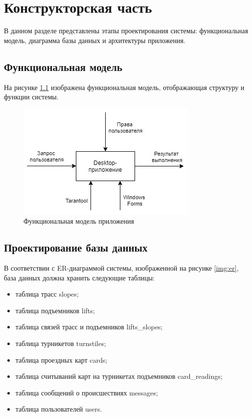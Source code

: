 \chapter{Конструкторская часть}

В данном разделе представлены этапы проектирования системы: функциональная модель, диаграмма базы данных и архитектуры приложения.

\section{Функциональная модель}

На рисунке \ref{img:func_model} изображена функциональная модель, отображающая структуру и функции системы.

\begin{figure}[h!]
	\begin{center}
		\includegraphics[scale=0.6]{../imgs/func_model.jpg}
	\end{center}
	\captionsetup{justification=centering}
	\caption{Функциональная модель приложения}
	\label{img:func_model}
\end{figure}









\section{Проектирование базы данных}


В соответствии с ER-диаграммой системы, изображенной на рисунке \ref{img:er}, база данных должна хранить следующие таблицы:  


\begin{itemize}
	\item таблица трасс slopes;
	\item таблица подъемников lifts;
	\item таблица связей трасс и подъемников lifts\_slopes;
	\item таблица турникетов turnstiles;
	\item таблица проездных карт cards;
	\item таблица считываний карт на турникетах подъемников card\_readings;
	\item таблица сообщений о происшествиях messages;
	\item таблица пользователей users.
\end{itemize}


